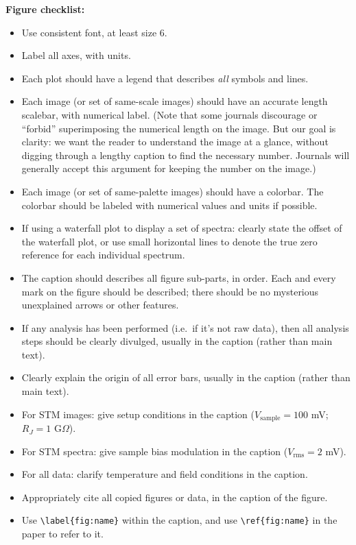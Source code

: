 \documentclass[aps,prb,twocolumn,superscriptaddress,floatfix,longbibliography]{revtex4-2}
\newcommand{\minfont}{6}
\begin{document}
\vspace{2mm}
\noindent \textbf{Figure checklist:}
\begin{itemize}[label=$\Box$]
\item Use consistent font, at least size \minfont.
\item Label all axes, with units.
\item Each plot should have a legend that describes {\em all} symbols and lines.
\item Each image (or set of same-scale images) should have an accurate length scalebar, with numerical label. (Note that some journals discourage or ``forbid'' superimposing the numerical length on the image. But our goal is clarity: we want the reader to understand the image at a glance, without digging through a lengthy caption to find the necessary number. Journals will generally accept this argument for keeping the number on the image.)
\item Each image (or set of same-palette images) should have a colorbar. The colorbar should be labeled with numerical values and units if possible.
\item If using a waterfall plot to display a set of spectra: clearly state the offset of the waterfall plot, or use small horizontal lines to denote the true zero reference for each individual spectrum.
\item The caption should describes all figure sub-parts, in order. Each and every mark on the figure should be described; there should be no mysterious unexplained arrows or other features.
\item If any analysis has been performed (i.e.\ if it's not raw data), then all analysis steps should be clearly divulged, usually in the caption (rather than main text).
\item Clearly explain the origin of all error bars, usually in the caption (rather than main text).
\item For STM images: give setup conditions in the caption ($V_\mathrm{sample}=100$ mV; $R_J=1$ G$\Omega$).
\item For STM spectra: give sample bias modulation in the caption ($V_\mathrm{rms}=2$ mV).
\item For all data: clarify temperature and field conditions in the caption.
\item Appropriately cite all copied figures or data, in the caption of the figure.
\item Use {\tt \textbackslash label\{fig:name\}} within the caption, and use {\tt \textbackslash ref\{fig:name\}} in the paper to refer to it.

\end{itemize}
\end{document}
